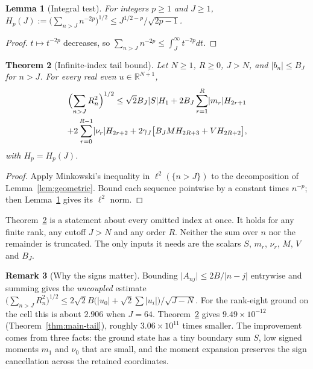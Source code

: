 \documentclass[11pt,a4paper]{article}
\newtheorem{theorem}{Theorem}[section]
\newtheorem{lemma}[theorem]{Lemma}
\theoremstyle{definition}
\newtheorem{remark}[theorem]{Remark}
\newcommand{\R}{\mathbb{R}}
\newcommand{\abs}[1]{\lvert #1\rvert}
\begin{document}
\begin{lemma}[Integral test]\label{lem:integral}
For integers $p\ge1$ and $J\ge1$,
$H_p(J):=\bigl(\sum_{n>J}n^{-2p}\bigr)^{1/2}\le J^{1/2-p}/\sqrt{2p-1}$.
\end{lemma}

\begin{proof}
$t\mapsto t^{-2p}$ decreases, so $\sum_{n>J}n^{-2p}\le\int_J^\infty t^{-2p}dt$.
\end{proof}

\begin{theorem}[Infinite-index tail bound]\label{thm:tail}
Let $N\ge1$, $R\ge0$, $J>N$, and $\abs{b_n}\le B_J$ for $n>J$. For every
real even $u\in\R^{N+1}$,
\begin{multline}\label{eq:tail}
\Bigl(\sum_{n>J}R_n^2\Bigr)^{1/2}\le\sqrt2B_J\abs SH_1+2B_J\sum_{r=1}^R\abs{m_r}H_{2r+1}\\
+2\sum_{r=0}^{R-1}\abs{\nu_r}H_{2r+2}+2\gamma_J\bigl[B_JMH_{2R+3}+VH_{2R+2}\bigr],
\end{multline}
with $H_p=H_p(J)$.
\end{theorem}

\begin{proof}
Apply Minkowski's inequality in $\ell^2(\{n>J\})$ to the decomposition of
Lemma~\ref{lem:geometric}. Bound each sequence pointwise by a constant times
$n^{-p}$; then Lemma~\ref{lem:integral} gives its $\ell^2$ norm.
\end{proof}

Theorem~\ref{thm:tail} is a statement about every omitted index at once.
It holds for any finite rank, any cutoff $J>N$ and any order $R$. Neither
the sum over $n$ nor the remainder is truncated. The only inputs it needs
are the scalars $S$, $m_r$, $\nu_r$, $M$, $V$ and $B_J$.

\begin{remark}[Why the signs matter]\label{rem:uncoupled}
Bounding $\abs{A_{nj}}\le2B/\abs{n-j}$ entrywise and summing gives the
\emph{uncoupled} estimate
$\bigl(\sum_{n>J}R_n^2\bigr)^{1/2}\le2\sqrt2B\bigl(\abs{u_0}+\sqrt2\sum\abs{u_i}\bigr)/\sqrt{J-N}$.
For the rank-eight ground on the cell this is about $2.906$ when $J=64$.
Theorem~\ref{thm:tail} gives $9.49\times10^{-12}$
(Theorem~\ref{thm:main-tail}), roughly $3.06\times10^{11}$ times smaller. The
improvement comes from three facts: the ground state has a tiny boundary
sum $S$, low signed moments $m_1$ and $\nu_0$ that are small, and the
moment expansion preserves the sign cancellation across the retained
coordinates.
\end{remark}
\end{document}
